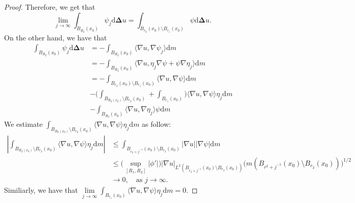 \documentclass{article}
\theoremstyle{remark}
\numberwithin{equation}{section}
\theoremstyle{definition}
\begin{document}
\begin{proof}
    Therefore, we get that
    \begin{equation}\label{step_1}
    	\lim_{j \to \infty} \int_{B_{R_{2}}(x_{0})} \psi_{j} \mathrm{d}\mathbf{\Delta}u = \int_{B_{r_{2}}(x_{0}) \setminus B_{r_{1}}(x_{0})} \psi \mathrm{d}\mathbf{\Delta}u.
    \end{equation}
    On the other hand, we have that
    \begin{equation}
    	\begin{split}
    		\int_{B_{R_{2}}(x_{0})} \psi_{j} \mathrm{d}\mathbf{\Delta}u & = - \int_{B_{R_{2}}(x_{0})} \langle \nabla u, \nabla \psi_{j} \rangle \mathrm{d}m\\
    		& = - \int_{B_{R_{2}}(x_{0})} \langle \nabla u, \eta_{j} \nabla \psi + \psi \nabla \eta_{j} \rangle \mathrm{d}m\\
    		& = - \int_{B_{r_{2}}(x_{0}) \setminus B_{r_{1}}(x_{0})} \langle \nabla u, \nabla \psi \rangle \mathrm{d}m\\
    		& - \Big(\int_{B_{R_{2}(x_{0})} \setminus B_{r_{2}}(x_{0})} + \int_{B_{r_{1}}(x_{0})} \Big) \langle \nabla u, \nabla \psi \rangle \eta_{j} \mathrm{d}m\\
    		& - \int_{B_{R_{2}}(x_{0})} \langle \nabla u, \nabla \eta_{j} \rangle \psi \mathrm{d}m
    	\end{split}
    \end{equation}
    We estimate $\int_{B_{R_{2}(x_{0})} \setminus B_{r_{2}}(x_{0})} \langle \nabla u, \nabla \psi \rangle \eta_{j} \mathrm{d}m$ as follow:
    \begin{equation}
    	\begin{split}
    		\left| \int_{B_{R_{2}(x_{0})} \setminus B_{r_{2}}(x_{0})} \langle \nabla u, \nabla \psi \rangle \eta_{j} \mathrm{d}m \right| & \le \int_{B_{r_{2} + j^{-1}}(x_{0}) \setminus B_{r_{2}}(x_{0})} \lvert \nabla u \rvert \lvert \nabla \psi \rvert \mathrm{d}m\\
    		& \le \Big(\sup_{[R_{1},R_{2}]} \lvert {\phi}' \rvert \Big) \lvert \nabla u \rvert_{L^{2}(B_{r_{2} + j^{-1}}(x_{0}) \setminus B_{r_{2}}(x_{0}))} \Big(m(B_{r^{2}+j^{-1}}(x_{0})\setminus B_{r_{2}}(x_{0}))\Big)^{1/2}\\
    		& \to 0,\quad \text{as } j \to \infty.
    	\end{split}
    \end{equation}
    Similiarly, we have that $\lim\limits_{j \to \infty} \int_{B_{r_{1}}(x_{0})} \langle \nabla u, \nabla \psi \rangle \eta_{j} \mathrm{d}m = 0$.
    

\end{proof}
\end{document}
